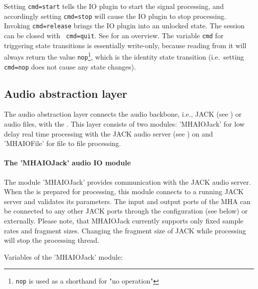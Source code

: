 Setting {\tt cmd=start} tells the IO plugin to start the signal
processing, and accordingly setting {\tt cmd=stop} will cause the IO
plugin to stop processing. Invoking {\tt cmd=release} brings the IO
plugin into an unlocked state. The session can be closed with {\tt
  cmd=quit}. See  for an overview.
%
The variable \verb!cmd! for triggering state transitions is
essentially write-only, because reading from it will always return the
value \verb!nop!\footnote{%
  \texttt{nop} is used as a shorthand for "no operation"%
}, which is the identity state transition (i.e.\ setting
\verb!cmd=nop! does not cause any state changes).


\subsection{Audio abstraction layer}%
\label{sec:audioabstraction}

The audio abstraction layer connects the audio backbone, i.e.,
JACK (see ) or audio files, with the \mhad{}.
%
This layer consists of two modules: 'MHAIOJack' for low delay real
time processing with the JACK audio server (see )
on \Linux{} and 'MHAIOFile' for file to file processing.

\paragraph{The 'MHAIOJack' audio IO module}%
%
%

The module 'MHAIOJack' provides communication with the JACK audio
server.
%
When the \mhad{} is prepared for processing, this module connects to a
running JACK server and validates its parameters. The input and output
ports of the MHA can be connected to any other JACK ports through the
\mha{} configuration (see below) or externally. Please note, that
MHAIOJack currently supports only fixed sample rates and fragment
sizes. Changing the fragment size of JACK while processing will stop
the \mha{} processing thread. 

Variables of the 'MHAIOJack' module:

